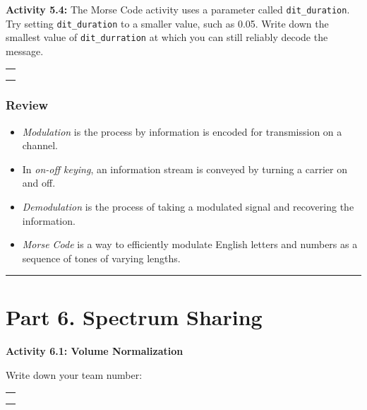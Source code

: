 \documentclass[11pt]{article}
\providecommand{\tightlist}{%
      \setlength{\itemsep}{0pt}\setlength{\parskip}{0pt}}
\begin{document}
\newpage
    \textbf{Activity 5.4:} The Morse Code activity uses a parameter called
\texttt{dit\_duration}. Try setting \texttt{dit\_duration} to a smaller
value, such as 0.05. Write down the smallest value of
\texttt{dit\_durration} at which you can still reliably decode the
message.

\begin{longtable}[]{@{}l@{}}
\toprule
 \\
\midrule
\endhead
 \\
 \\
 \\
\bottomrule
\end{longtable}

    \hypertarget{review}{%
\subsubsection*{Review}\label{review}}

\begin{itemize}
\tightlist
\item
  \emph{Modulation} is the process by information is encoded for
  transmission on a channel.
\item
  In \emph{on-off keying}, an information stream is conveyed by turning
  a carrier on and off.
\item
  \emph{Demodulation} is the process of taking a modulated signal and
  recovering the information.
\item
  \emph{Morse Code} is a way to efficiently modulate English letters and
  numbers as a sequence of tones of varying lengths.
\end{itemize}

\begin{center}\rule{\linewidth}{0.5pt}\end{center}

    \hypertarget{part-6.-spectrum-sharing}{%
\section*{Part 6. Spectrum Sharing}\label{part-6.-spectrum-sharing}}

    \textbf{Activity 6.1: Volume Normalization}

Write down your team number:

\begin{longtable}[]{@{}l@{}}
\toprule
 \\
\midrule
\endhead
 \\
 \\
 \\
\bottomrule
\end{longtable}
\end{document}
